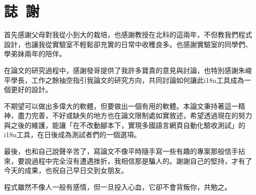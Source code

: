 \chapter*{誌~謝~}

首先感謝父母對我從小到大的栽培，也感謝教授在北科的這兩年，不但教我們程式設計，也讓我從實驗室不輕鬆卻充實的日常中收穫良多。也感謝實驗室的同學們、學弟妹兩年的陪伴。

在論文的研究過程中，感謝發哥提供了我許多寶貴的意見與討論，也特別感謝朱峻平學長，工作之餘抽空指引我論文的研究方向，共同討論如何讓此i18n工具成為一個更好的設計。

不期望可以做出多偉大的軟體，但要做出一個有用的軟體。本論文秉持著這一精神，盡力完善，不好或缺失的地方也在論文限制處如實敘述，希望透過現在的努力與之後的維護，能讓「在不改動腳本下，實現多國語言網頁自動化驗收測試」的i18n工具，在日後成為測試者們的一個選項。

最後，也和自己說聲辛苦了，寫論文不像平時隨手寫一些有趣的專案那般信手拈來，要說過程中完全沒有遭遇挫折，我相信那是騙人的。謝謝自己的堅持，才有了今天的成果，也祝自己早日交到女朋友。

程式雖然不像人一般有感情，但一旦投入心血，它卻不會背叛你，共勉之。
